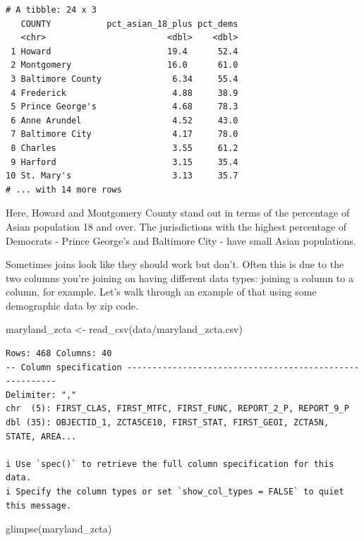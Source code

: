 \documentclass[
  letterpaper,
  DIV=11,
  numbers=noendperiod]{scrreprt}
\newenvironment{Shaded}{\begin{snugshade}}{\end{snugshade}}
\newcommand{\FunctionTok}[1]{\textcolor[rgb]{0.28,0.35,0.67}{#1}}
\newcommand{\NormalTok}[1]{\textcolor[rgb]{0.00,0.23,0.31}{#1}}
\newcommand{\OtherTok}[1]{\textcolor[rgb]{0.00,0.23,0.31}{#1}}
\newcommand{\StringTok}[1]{\textcolor[rgb]{0.13,0.47,0.30}{#1}}
\begin{document}
\begin{verbatim}
# A tibble: 24 x 3
   COUNTY           pct_asian_18_plus pct_dems
   <chr>                        <dbl>    <dbl>
 1 Howard                       19.4      52.4
 2 Montgomery                   16.0      61.0
 3 Baltimore County              6.34     55.4
 4 Frederick                     4.88     38.9
 5 Prince George's               4.68     78.3
 6 Anne Arundel                  4.52     43.0
 7 Baltimore City                4.17     78.0
 8 Charles                       3.55     61.2
 9 Harford                       3.15     35.4
10 St. Mary's                    3.13     35.7
# ... with 14 more rows
\end{verbatim}

Here, Howard and Montgomery County stand out in terms of the percentage
of Asian population 18 and over. The jurisdictions with the highest
percentage of Democrats - Prince George's and Baltimore City - have
small Asian populations.

Sometimes joins look like they should work but don't. Often this is due
to the two columns you're joining on having different data types:
joining a column to a column, for example. Let's walk through an example
of that using some demographic data by zip code.

\begin{Shaded}
\begin{Highlighting}[]
\NormalTok{maryland\_zcta }\OtherTok{\textless{}{-}} \FunctionTok{read\_csv}\NormalTok{(}\StringTok{\textquotesingle{}data/maryland\_zcta.csv\textquotesingle{}}\NormalTok{)}
\end{Highlighting}
\end{Shaded}

\begin{verbatim}
Rows: 468 Columns: 40
-- Column specification --------------------------------------------------------
Delimiter: ","
chr  (5): FIRST_CLAS, FIRST_MTFC, FIRST_FUNC, REPORT_2_P, REPORT_9_P
dbl (35): OBJECTID_1, ZCTA5CE10, FIRST_STAT, FIRST_GEOI, ZCTA5N, STATE, AREA...

i Use `spec()` to retrieve the full column specification for this data.
i Specify the column types or set `show_col_types = FALSE` to quiet this message.
\end{verbatim}

\begin{Shaded}
\begin{Highlighting}[]
\FunctionTok{glimpse}\NormalTok{(maryland\_zcta)}
\end{Highlighting}
\end{Shaded}
\end{document}
